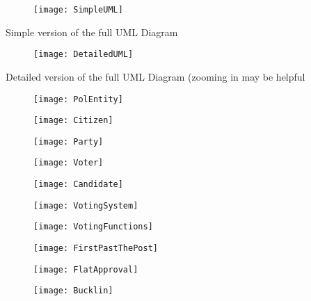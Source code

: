 \documentclass[12pt]{article}
\begin{document}
\begin{centering}
\begin{figure}[H]
\centering
\texttt{[image: SimpleUML]}
\end{figure}
\footnotesize Simple version of the full UML Diagram

\begin{figure}[H]
\centering
\texttt{[image: DetailedUML]}
\end{figure}
Detailed version of the full UML Diagram (zooming in may be helpful

\begin{figure}[H]
\centering
\texttt{[image: PolEntity]}
\end{figure}

\begin{figure}[H]
\centering
\texttt{[image: Citizen]}
\end{figure}

\begin{figure}[H]
\centering
\texttt{[image: Party]}
\end{figure}

\begin{figure}[H]
\centering
\texttt{[image: Voter]}
\end{figure}

\begin{figure}[H]
\centering
\texttt{[image: Candidate]}
\end{figure}

\begin{figure}[H]
\centering
\texttt{[image: VotingSystem]}
\end{figure}

\begin{figure}[H]
\centering
\texttt{[image: VotingFunctions]}
\end{figure}

\begin{figure}[H]
\centering
\texttt{[image: FirstPastThePost]}
\end{figure}

\begin{figure}[H]
\centering
\texttt{[image: FlatApproval]}
\end{figure}

\begin{figure}[H]
\centering
\texttt{[image: Bucklin]}
\end{figure}


\end{centering}
\end{document}
